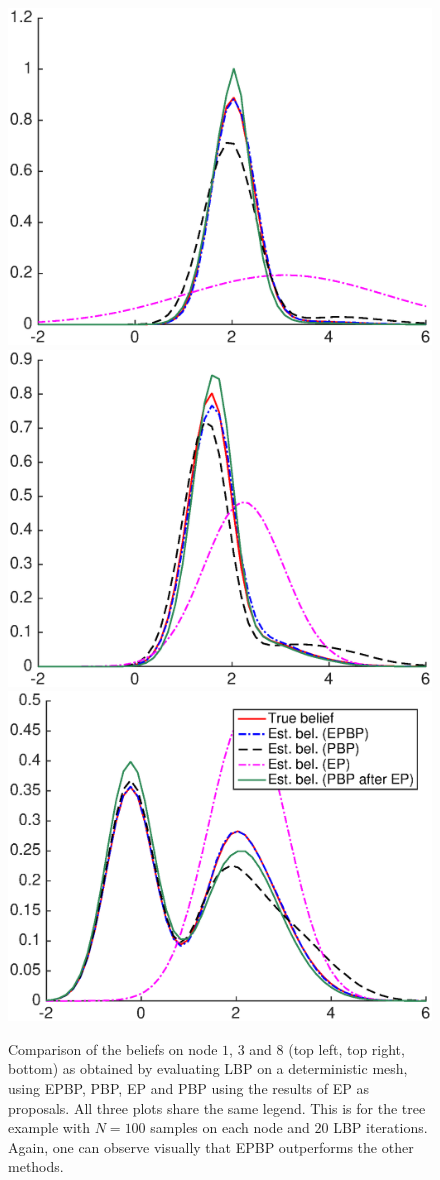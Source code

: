 \begin{figure}[!h]
\center
	\includegraphics[width=.48\textwidth]{figures/epbp/tree_node1}
	\includegraphics[width=.48\textwidth]{figures/epbp/tree_node3}
	\includegraphics[width=.48\textwidth]{figures/epbp/tree_node8}

	\caption{\label{compTree}Comparison of the beliefs on node $1$, $3$ and $8$ (top left, top right, bottom) as obtained by evaluating LBP on a deterministic mesh, using EPBP, PBP, EP and PBP using the results of EP as proposals. All three plots share the same legend. This is for the tree example with $N=100$ samples on each node and $20$ LBP iterations. Again, one can observe visually that EPBP outperforms the other methods. }
\end{figure}

